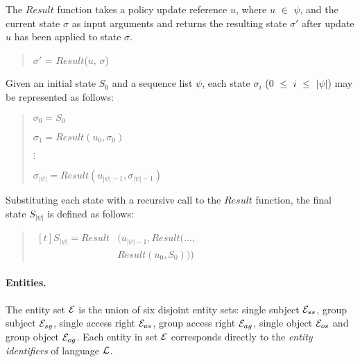\documentclass[10pt, twocolumn]{article}
\begin{document}
        The $Result$ function takes a policy update reference $u$, where $u$
        $\in$ $\psi$, and the current state $\sigma$ as input arguments and
        returns the resulting state $\sigma'$ after update $u$ has been applied
        to state $\sigma$.

        \begin{quote}
          $\sigma'$ = $Result$($u$, $\sigma$)
        \end{quote}

        Given an initial state $S_{0}$ and a sequence list $\psi$, each state
        $\sigma_{i}$ ($0$ $\leq$ $i$ $\leq$ $|\psi|$) may be represented as
        follows:

        \begin{quote}
          $\sigma_{0} = S_{0}$

          $\sigma_{1} = Result(u_{0}, \sigma_{0})$
         
          $\vdots$

          $\sigma_{|\psi|} = Result(u_{|\psi| - 1}, \sigma_{|\psi| - 1})$
        \end{quote}

        Substituting each state with a recursive call to the $Result$ function,
        the final state $S_{|\psi|}$ is defined as follows:

        \begin{quote}
          \begin{math}
            \begin{aligned}[t]
              S_{|\psi|} = Result&(u_{|\psi| - 1}, Result(\ldots, \\
              &Result(u_{0}, S_{0})))
            \end{aligned}
          \end{math}
        \end{quote}

        \paragraph{Entities.}

          The entity set ${\cal E}$ is the union of six disjoint entity sets:
          single subject ${\cal E}_{ss}$, group subject ${\cal E}_{sg}$,
          single access right ${\cal E}_{as}$, group access right
          ${\cal E}_{ag}$, single object ${\cal E}_{os}$ and group object
          ${\cal E}_{og}$. Each entity in set ${\cal E}$ corresponds directly
          to the \emph{entity identifiers} of language ${\cal L}$.
\end{document}
